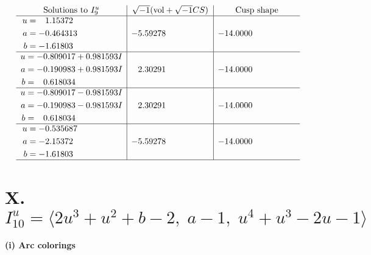\documentclass[1p]{elsarticle_modified}
\theoremstyle{definition}
\newcommand{\I}{\sqrt{-1}}
\begin{document}
$$\begin{array}{c|c|c}  
\text{Solutions to }I^u_{9}& \I (\text{vol} + \sqrt{-1}CS) & \text{Cusp shape}\\
 \hline 
\begin{aligned}
u &= \phantom{-}1.15372\phantom{ +0.000000I} \\
a &= -0.464313\phantom{ +0.000000I} \\
b &= -1.61803\phantom{ +0.000000I}\end{aligned}
 & -5.59278\phantom{ +0.000000I} & -14.0000\phantom{ +0.000000I} \\ \hline\begin{aligned}
u &= -0.809017 + 0.981593 I \\
a &= -0.190983 + 0.981593 I \\
b &= \phantom{-}0.618034\phantom{ +0.000000I}\end{aligned}
 & \phantom{-}2.30291\phantom{ +0.000000I} & -14.0000\phantom{ +0.000000I} \\ \hline\begin{aligned}
u &= -0.809017 - 0.981593 I \\
a &= -0.190983 - 0.981593 I \\
b &= \phantom{-}0.618034\phantom{ +0.000000I}\end{aligned}
 & \phantom{-}2.30291\phantom{ +0.000000I} & -14.0000\phantom{ +0.000000I} \\ \hline\begin{aligned}
u &= -0.535687\phantom{ +0.000000I} \\
a &= -2.15372\phantom{ +0.000000I} \\
b &= -1.61803\phantom{ +0.000000I}\end{aligned}
 & -5.59278\phantom{ +0.000000I} & -14.0000\phantom{ +0.000000I}\\
 \hline 
 \end{array}$$\newpage\newpage\renewcommand{\arraystretch}{1}
\centering \section*{X. $I^u_{10}= \langle 2 u^3+u^2+b-2,\;a-1,\;u^4+u^3-2 u-1 \rangle$}
\flushleft \textbf{(i) Arc colorings}\\
\end{document}
